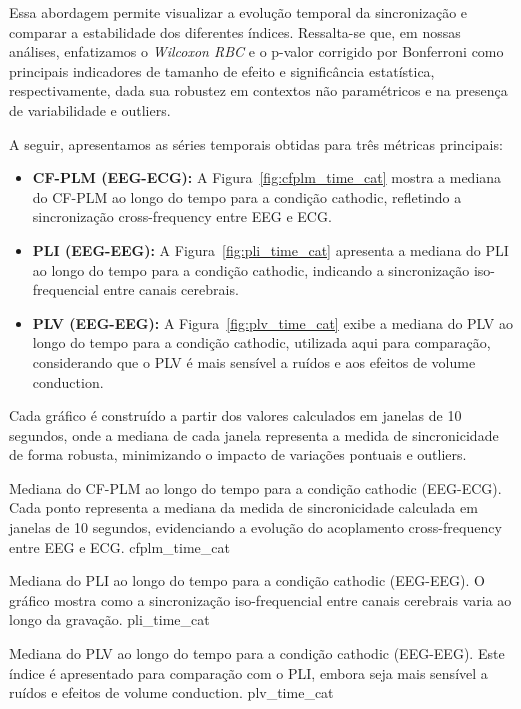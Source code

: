 Essa abordagem permite visualizar a evolução temporal da sincronização e comparar a estabilidade dos diferentes índices. Ressalta-se que, em nossas análises, enfatizamos o \emph{Wilcoxon RBC} e o p-valor corrigido por Bonferroni como principais indicadores de tamanho de efeito e significância estatística, respectivamente, dada sua robustez em contextos não paramétricos e na presença de variabilidade e outliers.

A seguir, apresentamos as séries temporais obtidas para três métricas principais:

\begin{itemize}
    \item \textbf{CF-PLM (EEG-ECG):} A Figura~\ref{fig:cfplm_time_cat} mostra a mediana do CF-PLM ao longo do tempo para a condição cathodic, refletindo a sincronização cross-frequency entre EEG e ECG.
    \item \textbf{PLI (EEG-EEG):} A Figura~\ref{fig:pli_time_cat} apresenta a mediana do PLI ao longo do tempo para a condição cathodic, indicando a sincronização iso-frequencial entre canais cerebrais.
    \item \textbf{PLV (EEG-EEG):} A Figura~\ref{fig:plv_time_cat} exibe a mediana do PLV ao longo do tempo para a condição cathodic, utilizada aqui para comparação, considerando que o PLV é mais sensível a ruídos e aos efeitos de volume conduction.
\end{itemize}

Cada gráfico é construído a partir dos valores calculados em janelas de 10 segundos, onde a mediana de cada janela representa a medida de sincronicidade de forma robusta, minimizando o impacto de variações pontuais e outliers.

{Mediana do CF-PLM ao longo do tempo para a condição cathodic (EEG-ECG). Cada ponto representa a mediana da medida de sincronicidade calculada em janelas de 10 segundos, evidenciando a evolução do acoplamento cross-frequency entre EEG e ECG.}
{cfplm_time_cat}

{Mediana do PLI ao longo do tempo para a condição cathodic (EEG-EEG). O gráfico mostra como a sincronização iso-frequencial entre canais cerebrais varia ao longo da gravação.}
{pli_time_cat}

{Mediana do PLV ao longo do tempo para a condição cathodic (EEG-EEG). Este índice é apresentado para comparação com o PLI, embora seja mais sensível a ruídos e efeitos de volume conduction.}
{plv_time_cat}

